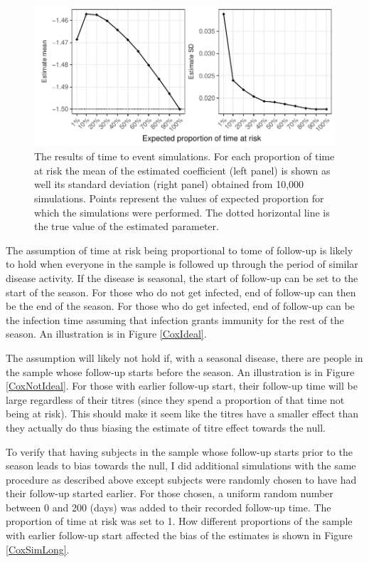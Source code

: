 \documentclass[12pt]{article}
\begin{document}
\begin{figure}[htp]
	\centering
	\includegraphics[width=1\textwidth]{../cox-tarprop-plot/risk.pdf}
	\caption{
	The results of time to event simulations. For each proportion of time at risk the mean of the estimated coefficient (left panel) is shown as well its standard deviation (right panel) obtained from 10,000 simulations. Points represent the values of expected proportion for which the simulations were performed. The dotted horizontal line is the true value of the estimated parameter.
	}
	\label{CoxSimResults}
\end{figure}

The assumption of time at risk being proportional to tome of follow-up is likely to hold when everyone in the sample is followed up through the period of similar disease activity. If the disease is seasonal, the start of follow-up can be set to the start of the season. For those who do not get infected, end of follow-up can then be the end of the season. For those who do get infected, end of follow-up can be the infection time assuming that infection grants immunity for the rest of the season. An illustration is in Figure \ref{CoxIdeal}.

The assumption will likely not hold if, with a seasonal disease, there are people in the sample whose follow-up starts before the season. An illustration is in Figure \ref{CoxNotIdeal}. For those with earlier follow-up start, their follow-up time will be large regardless of their titres (since they spend a proportion of that time not being at risk). This should make it seem like the titres have a smaller effect than they actually do thus biasing the estimate of titre effect towards the null.

To verify that having subjects in the sample whose follow-up starts prior to the season leads to bias towards the null, I did additional simulations with the same procedure as described above except subjects were randomly chosen to have had their follow-up started earlier. For those chosen, a uniform random number between 0 and 200 (days) was added to their recorded follow-up time. The proportion of time at risk was set to 1. How different proportions of the sample with earlier follow-up start affected the bias of the estimates is shown in Figure \ref{CoxSimLong}.
\end{document}
